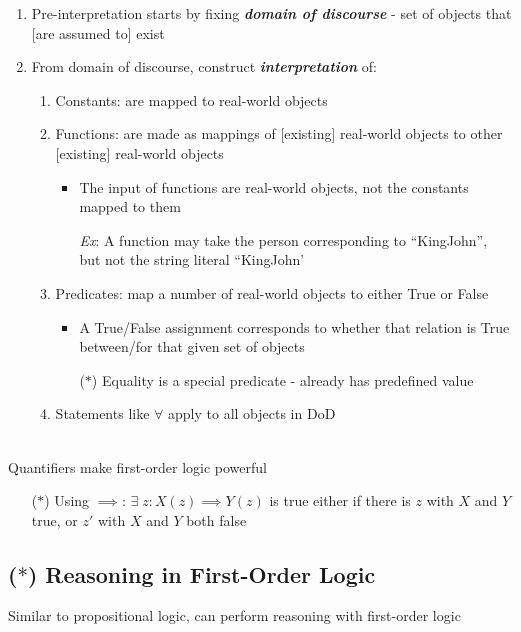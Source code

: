 \documentclass[12pt]{extarticle}
\theoremstyle{definition}
\theoremstyle{remark}
\newcommand{\pstart}[0]{\noindent}
\newcommand{\newp}[0]{~\\ \pstart}
\newcommand{\term}[1]{\noindent\textbf{\textit{#1}}}
\begin{document}
\begin{enumerate}
    \item Pre-interpretation starts by fixing \term{domain of discourse} - set of objects that [are assumed to] exist
    \item From domain of discourse, construct \term{interpretation} of: \begin{enumerate}
        \item Constants: are mapped to real-world objects
        \item Functions: are made as mappings of [existing] real-world objects to other [existing] real-world objects \begin{itemize}
            \item The input of functions are real-world objects, not the constants mapped to them

            \vspace{4pt}
            \textit{Ex}: A function may take the person corresponding to ``KingJohn'', but not the string literal ``KingJohn'
        \end{itemize}
        \item Predicates: map a number of real-world objects to either True or False \begin{itemize}
            \item A True/False assignment corresponds to whether that relation is True between/for that given set of objects
            \item[($\ast$)] Equality is a special predicate - already has predefined value
        \end{itemize}
        \item Statements like $\forall$ apply to all objects in DoD
    \end{enumerate}
\end{enumerate}

\newp
Quantifiers make first-order logic powerful \begin{itemize}
    \item[($\ast$)] Using $\implies$: $\exists\; z : X(z)\implies Y(z)$ is true either if there is $z$ with $X$ and $Y$ true, or $z'$ with $X$ and $Y$ both false
\end{itemize}

\subsection{($\ast$) Reasoning in First-Order Logic}
Similar to propositional logic, can perform reasoning with first-order logic
\end{document}
